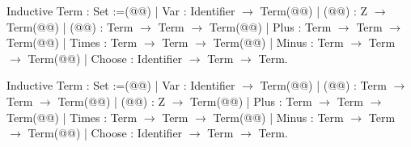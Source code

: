 Inductive Term : Set :=(@\vspace{-0.04cm}@)
| Var : Identifier $\rightarrow$ Term(@\vspace{-0.04cm}@)
| (@@) : Z $\rightarrow$ Term(@\vspace{-0.04cm}@)
| (@@) : Term $\rightarrow$ Term $\rightarrow$ Term(@\vspace{-0.04cm}@)
| Plus : Term $\rightarrow$ Term $\rightarrow$ Term(@\vspace{-0.04cm}@)
| Times : Term $\rightarrow$ Term $\rightarrow$ Term(@\vspace{-0.04cm}@)
| Minus : Term $\rightarrow$ Term $\rightarrow$ Term(@\vspace{-0.04cm}@)
| Choose : Identifier $\rightarrow$ Term $\rightarrow$ Term.

Inductive Term : Set :=(@\vspace{-0.04cm}@)
| Var : Identifier $\rightarrow$ Term(@\vspace{-0.04cm}@)
| (@@) : Term $\rightarrow$ Term $\rightarrow$ Term(@\vspace{-0.04cm}@)
| (@@) : Z $\rightarrow$ Term(@\vspace{-0.04cm}@)
| Plus : Term $\rightarrow$ Term $\rightarrow$ Term(@\vspace{-0.04cm}@)
| Times : Term $\rightarrow$ Term $\rightarrow$ Term(@\vspace{-0.04cm}@)
| Minus : Term $\rightarrow$ Term $\rightarrow$ Term(@\vspace{-0.04cm}@)
| Choose : Identifier $\rightarrow$ Term $\rightarrow$ Term.

